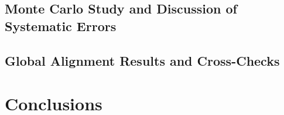 \documentclass[11pt,twoside,a4paper,pdftex,cmspaper]{cms-tdr}
\begin{document}
\subsection{Monte Carlo Study and Discussion of Systematic Errors}


\subsection{Global Alignment Results and Cross-Checks}
  

\section{Conclusions}


\end{document}

